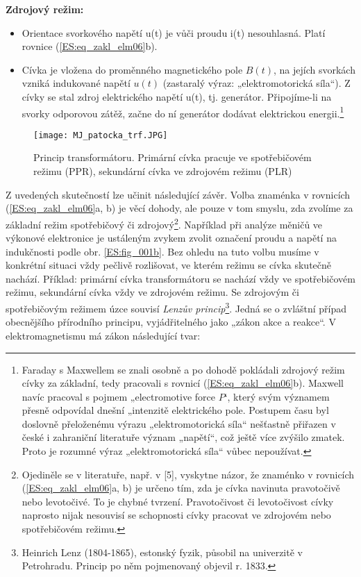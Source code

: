     \textbf{Zdrojový režim:}
    \begin{itemize}\addtolength{\itemsep}{-0.5\baselineskip}
      \item Orientace svorkového napětí u(t) je vůči proudu i(t) nesouhlasná. Platí rovnice
            (\ref{ES:eq_zakl_elm06}b).
      \item Cívka je vložena do proměnného magnetického pole \(B(t)\), na jejích svorkách vzniká
            indukované napětí \(u(t)\) (zastaralý výraz: „elektromotorická síla“). Z cívky se stal
            zdroj elektrického napětí u(t), tj. generátor. Připojíme-li na svorky odporovou zátěž,
            začne do ní generátor dodávat elektrickou energii.\footnote{Faraday s Maxwellem se
            znali osobně a po dohodě pokládali zdrojový režim cívky za základní, tedy pracovali s
            rovnicí (\ref{ES:eq_zakl_elm06}b). Maxwell navíc pracoval s pojmem „electromotive force
            \(P\)‘, který svým významem přesně odpovídal dnešní „intenzitě elektrického pole.
            Postupem času byl doslovně přeloženému výrazu „elektromotorická síla“ nešťastně
            přiřazen v české i zahraniční literatuře význam „napětí“, což ještě více zvýšilo
            zmatek. Proto je rozumné výraz „elektromotorická síla“ vůbec nepoužívat.}
    \end{itemize}
    \begin{figure}[ht!]
      \centering
      \texttt{[image: MJ\_patocka\_trf.JPG]}
      \caption[Princip transformátoru.]{Princip transformátoru. Primární cívka pracuje ve
               spotřebičovém režimu (PPR), sekundární cívka ve zdrojovém režimu (PLR)}
      \label{es:fig_MJ_patocka_trf}
    \end{figure}    
    Z uvedených skutečností lze učinit následující závěr. Volba znaménka v rovnicích
    (\ref{ES:eq_zakl_elm06}a, b) je věcí dohody, ale pouze v tom smyslu, zda zvolíme za základní
    režim spotřebičový či zdrojový\footnote{Ojediněle se v literatuře, např. v [5], vyskytne názor,
    že znaménko v rovnicích (\ref{ES:eq_zakl_elm06}a, b) je určeno tím, zda je cívka navinuta
    pravotočivě nebo levotočivé. To je chybné tvrzení. Pravotočivost či levotočivost cívky naprosto
    nijak nesouvisí se schopnosti cívky pracovat ve zdrojovém nebo spotřebičovém režimu.}. 
    Například při analýze měničů ve výkonové elektronice je ustáleným zvykem zvolit označení proudu
    a napětí na indukčnosti podle obr. \ref{ES:fig_001b}. Bez ohledu na tuto volbu musíme v 
    konkrétní situaci vždy pečlivě rozlišovat, ve kterém režimu se cívka skutečně nachází.
    Příklad: primární cívka transformátoru se nachází vždy ve spotřebičovém režimu, sekundární
    cívka vždy ve zdrojovém režimu. Se zdrojovým či spotřebičovým režimem úzce souvisí \emph{Lenzův
    princip}\footnote{Heinrich Lenz (1804-1865), estonský fyzik, působil na univerzitě v
    Petrohradu. Princip po něm pojmenovaný objevil r. 1833.}. Jedná se o zvláštní případ
    obecnějšího přírodního principu, vyjádřitelného jako „zákon akce a reakce“. V elektromagnetismu
    má zákon následující tvar:

